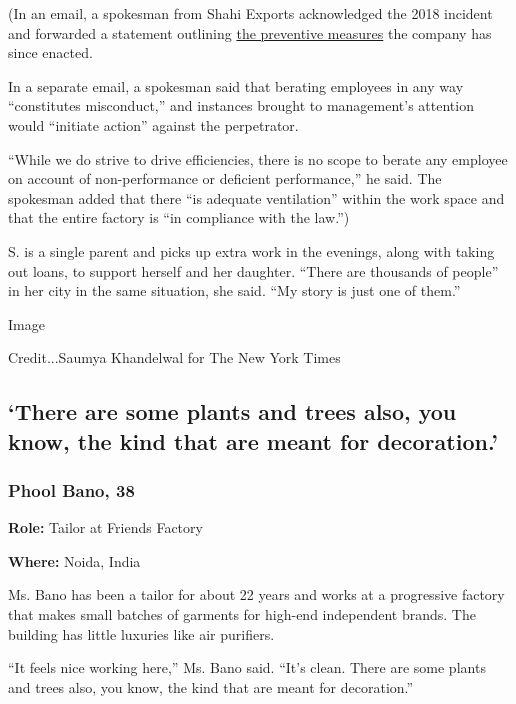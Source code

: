 (In an email, a spokesman from Shahi Exports acknowledged the 2018
incident and forwarded a statement outlining
\href{https://www.shahi.co.in/blog/?p=697}{the preventive measures} the
company has since enacted.

In a separate email, a spokesman said that berating employees in any way
``constitutes misconduct,'' and instances brought to management's
attention would ``initiate action'' against the perpetrator.

``While we do strive to drive efficiencies, there is no scope to berate
any employee on account of non-performance or deficient performance,''
he said. The spokesman added that there ``is adequate ventilation''
within the work space and that the entire factory is ``in compliance
with the law.'')

S. is a single parent and picks up extra work in the evenings, along
with taking out loans, to support herself and her daughter. ``There are
thousands of people'' in her city in the same situation, she said. ``My
story is just one of them.''

Image

Credit...Saumya Khandelwal for The New York Times

\hypertarget{there-are-some-plants-and-trees-also-you-know-the-kind-that-are-meant-for-decoration}{%
\subsection{`There are some plants and trees also, you know, the kind
that are meant for
decoration.'}\label{there-are-some-plants-and-trees-also-you-know-the-kind-that-are-meant-for-decoration}}

\hypertarget{phool-bano-38}{%
\subsubsection{Phool Bano, 38}\label{phool-bano-38}}

\textbf{Role:} Tailor at Friends Factory

\textbf{Where:} Noida, India

Ms. Bano has been a tailor for about 22 years and works at a progressive
factory that makes small batches of garments for high-end independent
brands. The building has little luxuries like air purifiers.

``It feels nice working here,'' Ms. Bano said. ``It's clean. There are
some plants and trees also, you know, the kind that are meant for
decoration.''

